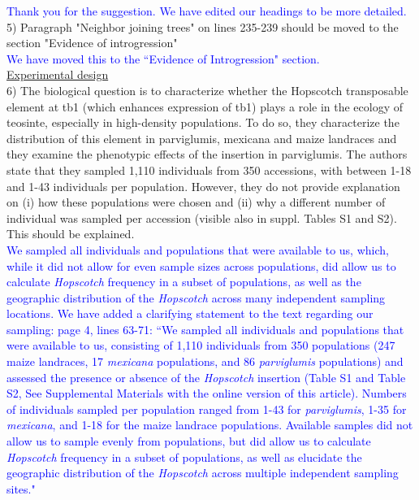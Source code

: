 \documentclass[11pt]{article}
\newcommand{\res}[1]{\noindent \textcolor{blue}{{#1}} \\}
\begin{document}
\res{Thank you for the suggestion. We have edited our headings to be more detailed.}

5) Paragraph "Neighbor joining trees" on lines 235-239 should be moved to the section "Evidence of introgression"\\

\res{We have moved this to the ``Evidence of Introgression" section.}

\underline{Experimental design}\\

6) The biological question is to characterize whether the Hopscotch transposable element at tb1 (which enhances expression of tb1) plays a role in the ecology of teosinte, especially in high-density populations. To do so, they characterize the distribution of this element in parviglumis, mexicana and maize landraces and they examine the phenotypic effects of the insertion in parviglumis.
The authors state that they sampled 1,110 individuals from 350 accessions, with between 1-18 and 1-43 individuals per population. However, they do not provide explanation on (i) how these populations were chosen and (ii) why a different number of individual was sampled per accession (visible also in suppl. Tables S1 and S2). This should be explained.\\

\res{We sampled all individuals and populations that were available to us, which, while it did not allow for even sample sizes across populations, did allow us to calculate \emph{Hopscotch} frequency in a subset of populations, as well as the geographic distribution of the \emph{Hopscotch} across many independent sampling locations. We have added a clarifying statement to the text regarding our sampling: page 4, lines 63-71: ``We sampled all individuals and populations that were available to us, consisting of 1,110 individuals from 350 populations (247 maize landraces, 17 \emph{mexicana} populations, and 86 \emph{parviglumis} populations) and assessed the presence or absence of the \emph{Hopscotch} insertion (Table S1 and Table S2, See Supplemental Materials with the online version of this article). Numbers of individuals sampled per population ranged from 1-43 for \emph{parviglumis}, 1-35 for \emph{mexicana}, and 1-18 for the maize landrace populations. Available samples did not allow us to sample evenly from populations, but did allow us to calculate \emph{Hopscotch} frequency in a subset of populations, as well as elucidate the geographic distribution of the \emph{Hopscotch} across multiple independent sampling sites."}
\end{document}
